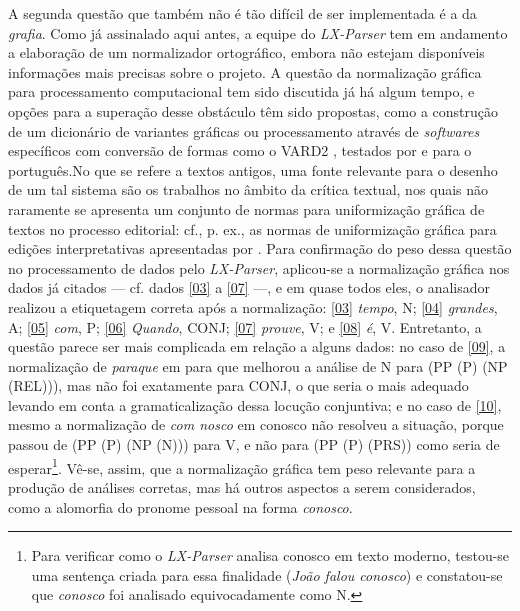 \documentclass[portuguese]{textolivre}
\begin{document}
A segunda questão que também não é tão difícil de ser implementada é a da \textit{grafia}. Como já assinalado aqui antes, a equipe do \textit{LX-Parser} tem em andamento a elaboração de um normalizador ortográfico, embora não estejam disponíveis informações mais precisas sobre o projeto. A questão da normalização gráfica para processamento computacional tem sido discutida já há algum tempo, e opções para a superação desse obstáculo têm sido propostas, como a construção de um dicionário de variantes gráficas \cite{giusti_automatic_2007} ou processamento através de \textit{softwares} específicos com conversão de formas como o VARD2 \cite{baron_tool_2008}, testados por \textcite{hendrickx_old_2011} e \textcite{marquilhas_manuscripts_2014} para o português.No que se refere a textos antigos, uma fonte relevante para o desenho de um tal sistema são os trabalhos no âmbito da crítica textual, nos quais não raramente se apresenta um conjunto de normas para uniformização gráfica de textos no processo editorial: cf., p. ex., as normas de uniformização gráfica para edições interpretativas apresentadas por \textcite[p.~131-132]{cambraia_introducao_2005}. Para confirmação do peso dessa questão no processamento de dados pelo \textit{LX-Parser}, aplicou-se a normalização gráfica nos dados já citados — cf. dados \ref{03} a \ref{07} —, e em quase todos eles, o analisador realizou a etiquetagem correta após a normalização: \ref{03} \textit{tempo}, N; \ref{04} \textit{grandes}, A; \ref{05} \textit{com}, P; \ref{06} \textit{Quando}, CONJ; \ref{07} \textit{prouve}, V; e \ref{08} \textit{é}, V. Entretanto, a questão parece ser mais complicada em relação a alguns dados: no caso de \ref{09}, a normalização de \textit{paraque} em para que melhorou a análise de N para (PP (P) (NP (REL))), mas não foi exatamente para CONJ, o que seria o mais adequado levando em conta a gramaticalização dessa locução conjuntiva; e no caso de \ref{10}, mesmo a normalização de \textit{com nosco} em conosco não resolveu a situação, porque passou de (PP (P) (NP (N))) para V, e não para (PP (P) (PRS)) como seria de esperar\footnote{Para verificar como o \textit{LX-Parser} analisa conosco em texto moderno, testou-se uma sentença criada para essa finalidade (\textit{João falou conosco}) e constatou-se que \textit{conosco} foi analisado equivocadamente como N.}. Vê-se, assim, que a normalização gráfica tem peso relevante para a produção de análises corretas, mas há outros aspectos a serem considerados, como a alomorfia do pronome pessoal na forma \textit{conosco}.
\end{document}
